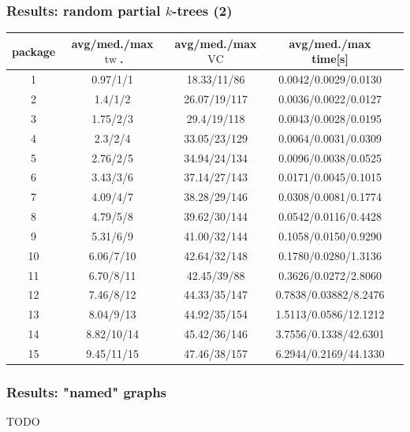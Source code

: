 \documentclass[11pt]{beamer}
\DeclareMathOperator{\tw}{tw}
\DeclareMathOperator{\VC}{VC}
\begin{document}
\begin{frame}
\frametitle{Results: random partial $k$-trees (2)}

\begin{center}
\footnotesize
\begin{table}[h!]
\centering
\begin{tabular}{|c|c|c|c|c|}
\hline
package & avg/med./max $\tw$. & avg/med./max $\VC$ & avg/med./max time[s] \\
\hline \hline
1 & 0.97/1/1 & 18.33/11/86 & 0.0042/0.0029/0.0130 \\
\hline
2 & 1.4/1/2 & 26.07/19/117 & 0.0036/0.0022/0.0127 \\
\hline
3 & 1.75/2/3 & 29.4/19/118 & 0.0043/0.0028/0.0195 \\
\hline
4 & 2.3/2/4 & 33.05/23/129 & 0.0064/0.0031/0.0309 \\
\hline
5 & 2.76/2/5 & 34.94/24/134 & 0.0096/0.0038/0.0525 \\
\hline
6 & 3.43/3/6 & 37.14/27/143 & 0.0171/0.0045/0.1015 \\
\hline
7 & 4.09/4/7 & 38.28/29/146 & 0.0308/0.0081/0.1774 \\
\hline
8 & 4.79/5/8 & 39.62/30/144 & 0.0542/0.0116/0.4428 \\
\hline
9 & 5.31/6/9 & 41.00/32/144 & 0.1058/0.0150/0.9290 \\
\hline
10 & 6.06/7/10 & 42.64/32/148 & 0.1780/0.0280/1.3136 \\
\hline
11 & 6.70/8/11 & 42.45/39/88 & 0.3626/0.0272/2.8060 \\
\hline
12 & 7.46/8/12 & 44.33/35/147 & 0.7838/0.03882/8.2476 \\
\hline
13 & 8.04/9/13 & 44.92/35/154 & 1.5113/0.0586/12.1212 \\
\hline
14 & 8.82/10/14 & 45.42/36/146 & 3.7556/0.1338/42.6301 \\
\hline
15 & 9.45/11/15 & 47.46/38/157 & 6.2944/0.2169/44.1330 \\
\hline
\end{tabular}
\end{table}
\end{center}

\end{frame}


\begin{frame}
\frametitle{Results: "named" graphs}

TODO

\end{frame}
\end{document}
